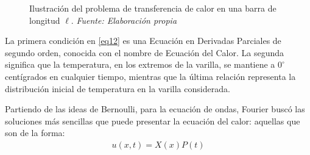 \begin{figure}[h]
	\centering
 	\caption[Ilustración del problema de transferencia de calor en una barra de longitud $\ell$.  ]{ Ilustración del problema de transferencia de calor en una barra de longitud $\ell$.  \textit{ Fuente: Elaboración propia} }
	\label{fig:barra-pi}  %
\end{figure}

La primera condición en \ref{eq12} es una Ecuación en Derivadas Parciales de segundo orden, conocida con el nombre de Ecuación del Calor. La segunda significa que la temperatura, en los extremos de la varilla, se mantiene a \( 0^\circ \) centígrados en cualquier tiempo, mientras que la última relación representa la distribución inicial de temperatura en la varilla considerada.

Partiendo de las ideas de Bernoulli, para la ecuación de ondas, Fourier buscó las soluciones más sencillas que puede presentar la ecuación del calor: aquellas que son de la forma:
\begin{equation} \label{eq14}
	\begin{split}
		u(x,t) = X(x)P(t) \\
	\end{split}
\end{equation}

